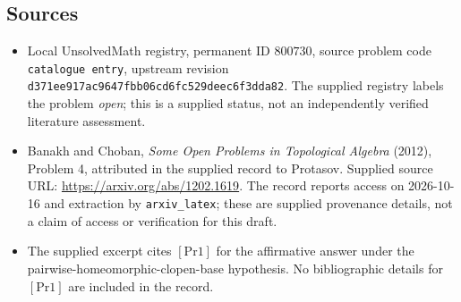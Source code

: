 \documentclass[11pt]{article}
\begin{document}
\subsection{Sources}
\begin{itemize}
\item Local UnsolvedMath registry, permanent ID \(800730\), source problem code \texttt{catalogue entry}, upstream revision \texttt{d371ee917ac9647fbb06cd6fc529deec6f3dda82}. The supplied registry labels the problem \emph{open}; this is a supplied status, not an independently verified literature assessment.
\item Banakh and Choban, \emph{Some Open Problems in Topological Algebra} (2012), Problem 4, attributed in the supplied record to Protasov. Supplied source URL: \url{https://arxiv.org/abs/1202.1619}. The record reports access on 2026-10-16 and extraction by \texttt{arxiv\_latex}; these are supplied provenance details, not a claim of access or verification for this draft.
\item The supplied excerpt cites \([\mathrm{Pr1}]\) for the affirmative answer under the pairwise-homeomorphic-clopen-base hypothesis. No bibliographic details for \([\mathrm{Pr1}]\) are included in the record.
\end{itemize}
\end{document}
